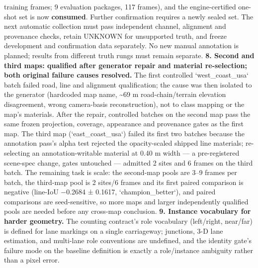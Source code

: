 \documentclass[journal]{IEEEtran}
\begin{document}
training frames; 9 evaluation packages, 117 frames), and the engine-certified one-shot set is
now \textbf{consumed}. Further confirmation requires a newly sealed set. The next automatic collection
must pass independent channel, alignment and provenance checks, retain UNKNOWN for unsupported
truth, and freeze development and confirmation data separately. No new manual annotation is
planned; results from different truth rungs must remain separate.
\textbf{8. Second and third maps: qualified after generator repair and material re-selection; both original failure causes resolved.}
The first controlled `west_coast_usa` batch failed road, line and alignment qualification; the cause was then
isolated to the generator (hardcoded map name, \textasciitilde{}69 m road-chain/terrain elevation disagreement,
wrong camera-basis reconstruction), not to class mapping or the map's materials. After the
repair, controlled batches on the second map pass the same frozen projection, coverage,
appearance and provenance gates as the first map. The third map (`east_coast_usa`) failed its
first two batches because the annotation pass's alpha test rejected the opacity-scaled shipped
line materials; re-selecting an annotation-writable material at 0.40 m width --- a pre-registered
scene-spec change, gates untouched --- admitted 2 sites and 6 frames on the third batch. The
remaining task is scale: the second-map pools are 3--9 frames per batch, the third-map pool is
2 sites/6 frames and its first paired comparison is negative (line-IoU −0.2684 ± 0.1617,
`champion_better`), and paired comparisons are seed-sensitive, so more
maps and larger independently qualified pools are needed before any cross-map conclusion.
\textbf{9. Instance vocabulary for harder geometry.} The counting contract's role vocabulary
(left/right, near/far) is defined for lane markings on a single carriageway; junctions, 3-D lane
estimation, and multi-lane role conventions are undefined, and the identity gate's failure mode
on the baseline definition is exactly a role/instance ambiguity rather than a pixel error.
\end{document}
